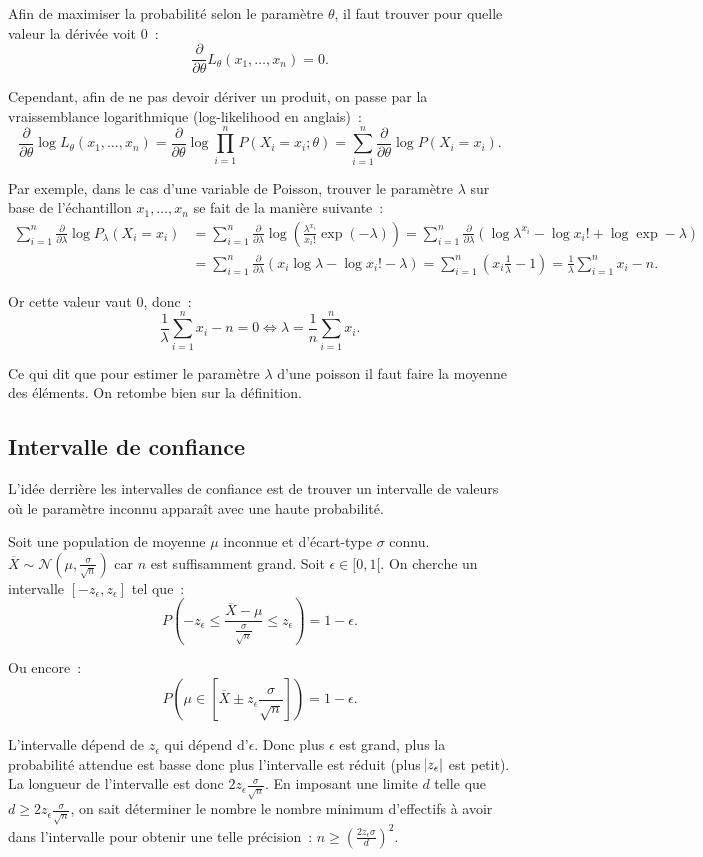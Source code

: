 \documentclass{article}
\renewcommand{\pd}[1]{\frac {\partial}{\partial #1}}
\begin{document}
		Afin de maximiser la probabilité selon le paramètre $\theta$, il faut trouver pour quelle valeur la dérivée voit 0~:
		\[\pd \theta L_\theta(x_1, \ldots, x_n) = 0.\]

		Cependant, afin de ne pas devoir dériver un produit, on passe par la vraissemblance logarithmique (log-likelihood en anglais)~:
		\[\pd \theta \log L_\theta(x_1, \ldots, x_n) = \pd \theta \log \prod_{i=1}^n P(X_i=x_i ; \theta) = \sum_{i=1}^n \pd \theta \log P(X_i=x_i).\]

		Par exemple, dans le cas d'une variable de Poisson, trouver le paramètre $\lambda$ sur base de l'échantillon $x_1, \ldots, x_n$ se fait de la manière suivante~:
		\begin{align*}
			\sum_{i=1}^n\pd \lambda \log P_\lambda(X_i=x_i) &= \sum_{i=1}^n \pd \lambda \log\left(\frac {\lambda^{x_i}}{x_i!}\exp(-\lambda)\right)
				= \sum_{i=1}^n\pd \lambda \left(\log\lambda^{x_i} - \log x_i! + \log\exp-\lambda\right) \\
			&= \sum_{i=1}^n\pd\lambda\left(x_i\log\lambda - \log x_i! - \lambda\right) = \sum_{i=1}^n\left(x_i\frac 1\lambda - 1\right)
				= \frac 1\lambda\sum_{i=1}^nx_i - n.
		\end{align*}

		Or cette valeur vaut 0, donc~:
		\[\frac 1\lambda\sum_{i=1}^nx_i - n = 0 \iff \lambda = \frac 1n\sum_{i=1}^nx_i.\]

		Ce qui dit que pour estimer le paramètre $\lambda$ d'une poisson il faut faire la moyenne des éléments. On retombe bien sur la définition.

	\subsection{Intervalle de confiance}
		L'idée derrière les intervalles de confiance est de trouver un intervalle de valeurs où le paramètre inconnu apparaît avec une haute probabilité.

		Soit une population de moyenne $\mu$ inconnue et d'écart-type $\sigma$ connu. $\overline X \sim \mathcal N(\mu, \frac \sigma{\sqrt n})$ car $n$ est suffisamment
		grand. Soit $\epsilon \in [0, 1[$. On cherche un intervalle $[-z_\epsilon, z_\epsilon]$ tel que~:
		\[P\left(-z_\epsilon \leq \frac {\overline X-\mu}{\frac \sigma{\sqrt n}} \leq z_\epsilon\right) = 1-\epsilon.\]

		Ou encore~:
		\[P\left(\mu \in \left[\overline X \pm z_\epsilon\frac \sigma{\sqrt n}\right]\right) = 1-\epsilon.\]

		L'intervalle dépend de $z_\epsilon$ qui dépend d'$\epsilon$. Donc plus $\epsilon$ est grand, plus la probabilité attendue est basse donc plus l'intervalle est
		réduit (plus $\abs{z_\epsilon}$ est petit). La longueur de l'intervalle est donc $2z_\epsilon\frac \sigma{\sqrt n}$. En imposant une limite $d$ telle que
		$d \geq 2z_\epsilon\frac \sigma{\sqrt n}$, on sait déterminer le nombre le nombre minimum d'effectifs à avoir dans l'intervalle pour obtenir une telle
		précision~: $n \geq \left(\frac {2z_\epsilon\sigma}d\right)^2$.
\end{document}
